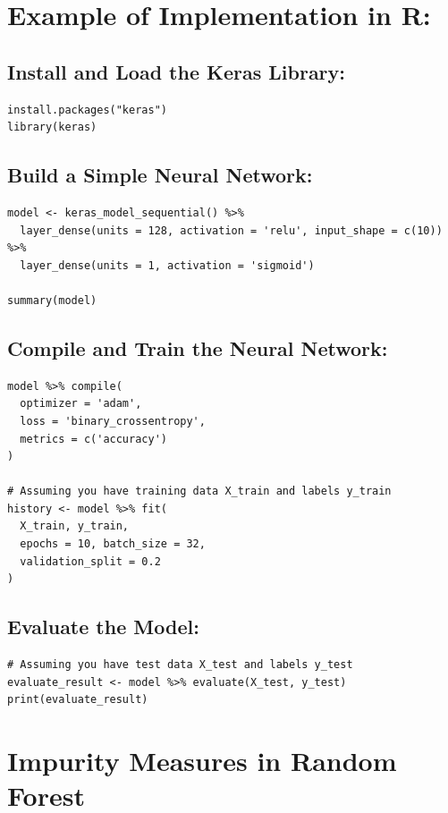\documentclass[12pt]{article}
\begin{document}
\section{Example of Implementation in R:}

\subsection{Install and Load the Keras Library:}
\begin{verbatim}
install.packages("keras")
library(keras)
\end{verbatim}

\subsection{Build a Simple Neural Network:}
\begin{verbatim}
model <- keras_model_sequential() %>%
  layer_dense(units = 128, activation = 'relu', input_shape = c(10)) %>%
  layer_dense(units = 1, activation = 'sigmoid')

summary(model)
\end{verbatim}

\subsection{Compile and Train the Neural Network:}
\begin{verbatim}
model %>% compile(
  optimizer = 'adam',
  loss = 'binary_crossentropy',
  metrics = c('accuracy')
)

# Assuming you have training data X_train and labels y_train
history <- model %>% fit(
  X_train, y_train,
  epochs = 10, batch_size = 32,
  validation_split = 0.2
)
\end{verbatim}

\subsection{Evaluate the Model:}
\begin{verbatim}
# Assuming you have test data X_test and labels y_test
evaluate_result <- model %>% evaluate(X_test, y_test)
print(evaluate_result)
\end{verbatim}


\section{Impurity Measures in Random Forest}
\end{document}
